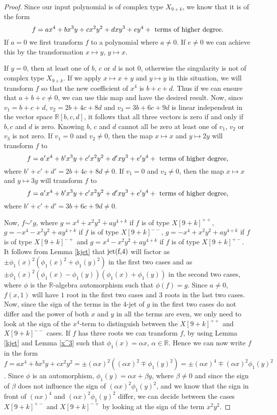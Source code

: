 \documentclass{amsproc}
\begin{document}
\begin{proof}
Since our input polynomial is of complex type $X_{9+k}$, we know that it is of the form \[f=ax^4+bx^3y+cx^2y^2+dxy^3+ey^4+\textnormal{ terms of higher degree.}\]
If $a= 0$ we first transform $f$ to a polynomial where $a\neq 0$. If $e\neq 0$ we can achieve this by the transformation $x\mapsto y$, $y\mapsto x$. 

If $y=0$, then at least one of $b$, $c$ or $d$ is not $0$, otherwise the singularity  is not of complex type $X_{9+k}$.  If we apply $x\mapsto x+y$ and $y\mapsto y$ in this situation, we will transform $f$ so that the new coefficient of $x^4$ is $b+c+d$. Thus if we can ensure that $a+b+c\neq 0$, we can use this map and have the desired result. Now, since $v_1=b+c+d$, $v_2=2b+4c+8d$ and $v_3=3b+6c+9d$ is linear independent in the vector space $\mathbb R [b,c,d]$, it follows that all three vectors is zero if and only if $b,c$ and $d$ is zero. Knowing $b$, $c$ and $d$ cannot all be zero at least one of $v_1$, $v_2$ or $v_3$ is not zero. If $v_1=0$ and $v_2\neq 0$, then the map $x\mapsto x$ and $y\mapsto 2y$ will transform $f$ to \[f=a'x^4+b'x^3y+c'x^2y^2+d'xy^3+e'y^4+\textnormal{ terms of higher degree,}\] where $b'+c'+d'=2b+4c+8d\neq 0$. If $v_1=0$ and $v_3\neq 0$, then the map $x\mapsto x$ and $y\mapsto 3y$ will transform $f$ to  \[f=a'x^4+b'x^3y+c'x^2y^2+d'xy^3+e'y^4+\textnormal{ terms of higher degree,}\]where $b'+c'+d'=3b+6c+9d\neq0$.

Now, $f\sim^rg$, where $g=x^4+x^2y^2+ay^{4+k}$ if $f$ is of type $X[9+k]^{++}$, $g=-x^4-x^2y^2+ay^{4+k}$ if $f$ is of type $X[9+k]^{--}$, $g=-x^4+x^2y^2+ay^{4+k}$ if $f$ is of type $X[9+k]^{-+}$ and $g=x^4-x^2y^2+ay^{4+k}$ if $f$ is of type $X[9+k]^{+-}$.  It follows from Lemma \ref{kjet} that $\textnormal{jet(f,4)}$ will factor as $\pm\phi_1(x)^2(\phi_1(x)^2+\phi_1(y)^2)$ in the first two cases and as $\pm\phi_1(x)^2(\phi_1(x)-\phi_1(y))(\phi_1(x)+\phi_1(y))$ in the second two cases, where $\phi$ is the $\mathbb R$-algebra automorphism such that $\phi(f)=g$. Since $a\neq 0$,  $f(x,1)$ will have $1$ root in the first two cases and $3$ roots in the last two cases. 
Now, since the sign of the terms in the $4$-jet of $g$ in the first two cases do not differ and the power of both $x$ and $y$ in all the terms are even, we only need to look at the sign of the $x^4$-term to distinguish between the $X[9+k]^{++}$ and $X[9+k]^{--}$ cases. If $f$ has three roots we can transform $f$, by using Lemma \ref{kjet} and Lemma \ref{x^3} such that $\phi_1(x)=\alpha x$, $\alpha\in\mathbb R$. Hence we can now write $f$ in the form $f=ax^4+bx^3y+cx^2y^2=\pm(\alpha x)^2((\alpha x)^2\mp\phi_1(y)^2)=\pm(\alpha x)^4\mp (\alpha x)^2\phi_1(y)^2$. Since $\phi$ is an automorphism, $\phi_1(y)=\alpha x+\beta y$, where $\beta \neq 0$ and since the sign of $\beta$ does not influence the sign of $(\alpha x)^2\phi_1(y)^2$, and we know that the sign in front of $(\alpha x)^4$ and $(\alpha x)^2\phi_1(y)^2$ differ, we can decide between the cases $X[9+k]^{+-}$ and $X[9+k]^{-+}$ by looking at the sign of the term $x^2y^2$.
\end{proof}
\end{document}
